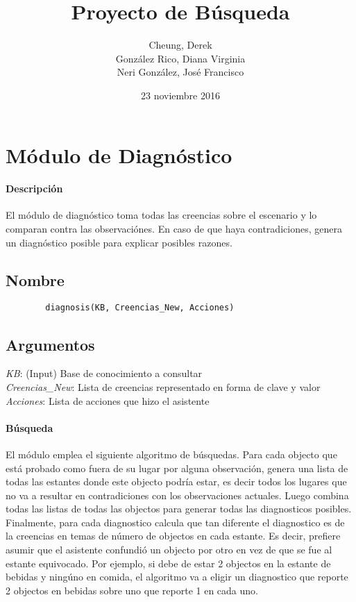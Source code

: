 \documentclass[11pt,fleqn]{article}
\begin{document}
\title{Proyecto de Búsqueda}
\author{
	Cheung, Derek \\
	González Rico, Diana Virginia \\
	Neri González, José Francisco
}
\date{23 noviembre 2016}
\maketitle

\section{Módulo de Diagnóstico}

\paragraph{Descripción} El módulo de diagnóstico toma todas las creencias sobre el escenario y lo comparan contra las observaciónes. En caso de que haya contradiciones, genera un diagnóstico posible para explicar posibles razones.

\subsection*{Nombre}
	\begin{verbatim}
		diagnosis(KB, Creencias_New, Acciones)
	\end{verbatim}

\subsection*{Argumentos}
	\textit{KB}: (Input) Base de conocimiento a consultar \\
	\textit{Creencias\_New}: Lista de creencias representado en forma de clave y valor \\
	\textit{Acciones}: Lista de acciones que hizo el asistente

\paragraph{Búsqueda} El módulo emplea el siguiente algoritmo de búsquedas. Para cada objecto que está probado como fuera de su lugar por alguna observación, genera una lista de todas las estantes donde este objecto podría estar, es decir todos los lugares que no va a resultar en contradiciones con los observaciones actuales. Luego combina todas las listas de todas las objectos para generar todas las diagnosticos posibles. Finalmente, para cada diagnostico calcula que tan diferente el diagnostico es de la creencias en temas de número de objectos en cada estante. Es decir, prefiere asumir que el asistente confundió un objecto por otro en vez de que se fue al estante equivocado. Por ejemplo, si debe de estar 2 objectos en la estante de bebidas y ningúno en comida, el algoritmo va a eligir un diagnostico que reporte 2 objectos en bebidas sobre uno que reporte 1 en cada uno.
\end{document}

